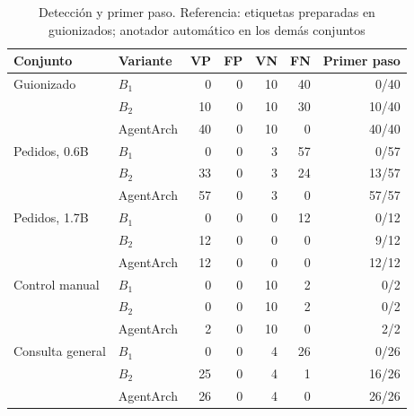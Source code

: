 \begin{table}[!t]
\caption{Detección y primer paso. Referencia: etiquetas preparadas en guionizados; anotador automático en los demás conjuntos}
\label{tab:detection}
\centering\footnotesize
\setlength{\tabcolsep}{3pt}
\begin{tabular*}{\columnwidth}{@{\extracolsep{\fill}}llrrrrr}
\hline
Conjunto & Variante & VP & FP & VN & FN & Primer paso\\
\hline
Guionizado & $B_1$ & 0 & 0 & 10 & 40 & 0/40\\
 & $B_2$ & 10 & 0 & 10 & 30 & 10/40\\
 & AgentArch & 40 & 0 & 10 & 0 & 40/40\\
Pedidos, 0.6B & $B_1$ & 0 & 0 & 3 & 57 & 0/57\\
 & $B_2$ & 33 & 0 & 3 & 24 & 13/57\\
 & AgentArch & 57 & 0 & 3 & 0 & 57/57\\
Pedidos, 1.7B & $B_1$ & 0 & 0 & 0 & 12 & 0/12\\
 & $B_2$ & 12 & 0 & 0 & 0 & 9/12\\
 & AgentArch & 12 & 0 & 0 & 0 & 12/12\\
Control manual & $B_1$ & 0 & 0 & 10 & 2 & 0/2\\
 & $B_2$ & 0 & 0 & 10 & 2 & 0/2\\
 & AgentArch & 2 & 0 & 10 & 0 & 2/2\\
Consulta general & $B_1$ & 0 & 0 & 4 & 26 & 0/26\\
 & $B_2$ & 25 & 0 & 4 & 1 & 16/26\\
 & AgentArch & 26 & 0 & 4 & 0 & 26/26\\
\hline\end{tabular*}\end{table}
